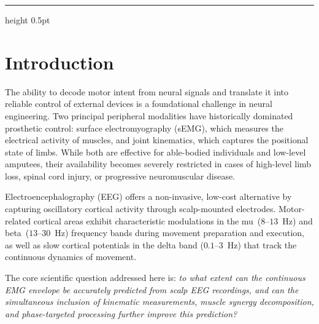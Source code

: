 \documentclass[12pt, a4paper]{article}
\begin{document}
	\hrule height 0.5pt
	\vspace{10pt}
	
	\tableofcontents
	\newpage
	
	\section{Introduction}
	
	The ability to decode motor intent from neural signals and translate it into
	reliable control of external devices is a foundational challenge in neural
	engineering. Two principal peripheral modalities have historically dominated
	prosthetic control: surface electromyography (sEMG), which measures the
	electrical activity of muscles, and joint kinematics, which captures the
	positional state of limbs. While both are effective for able-bodied
	individuals and low-level amputees, their availability becomes severely
	restricted in cases of high-level limb loss, spinal cord injury, or
	progressive neuromuscular disease.
	
	Electroencephalography (EEG) offers a non-invasive, low-cost alternative by
	capturing oscillatory cortical activity through scalp-mounted electrodes.
	Motor-related cortical areas exhibit characteristic modulations in the
	mu~($8$--$13$~Hz) and beta~($13$--$30$~Hz) frequency bands during movement
	preparation and execution, as well as slow cortical potentials in the delta
	band ($0.1$--$3$~Hz) that track the continuous dynamics of movement.
	
	The core scientific question addressed here is: \textit{to what extent can
		the continuous EMG envelope be accurately predicted from scalp EEG
		recordings, and can the simultaneous inclusion of kinematic measurements,
		muscle synergy decomposition, and phase-targeted processing further
		improve this prediction?}
	
\end{document}

